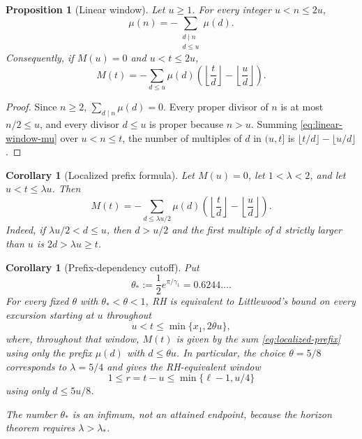 \documentclass[11pt]{amsart}
\numberwithin{equation}{section}
\theoremstyle{plain}
\newtheorem{proposition}[theorem]{Proposition}
\newtheorem{corollary}[theorem]{Corollary}
\theoremstyle{definition}
\theoremstyle{remark}
\begin{document}
\begin{proposition}[Linear window]
\label{prop:linear-window}
Let $u\ge1$. For every integer $u<n\le2u$,
\begin{equation}
\label{eq:linear-window-mu}
\mu(n)=-\sum_{\substack{d\mid n\\ d\le u}}\mu(d).
\end{equation}
Consequently, if $M(u)=0$ and $u<t\le2u$,
\begin{equation}
\label{eq:linear-window-M}
M(t)=-\sum_{d\le u}\mu(d)\left(\left\lfloor\frac td\right\rfloor
-\left\lfloor\frac ud\right\rfloor\right).
\end{equation}
\end{proposition}

\begin{proof}
Since $n\ge2$, $\sum_{d\mid n}\mu(d)=0$. Every proper divisor of $n$ is at
most $n/2\le u$, and every divisor $d\le u$ is proper because $n>u$. Summing
\eqref{eq:linear-window-mu} over $u<n\le t$, the number of multiples of $d$
in $(u,t]$ is $\lfloor t/d\rfloor-\lfloor u/d\rfloor$.
\end{proof}

\begin{corollary}[Localized prefix formula]
\label{cor:localized-prefix}
Let $M(u)=0$, let $1<\lambda<2$, and let $u<t\le\lambda u$.  Then
\begin{equation}
\label{eq:localized-prefix}
M(t)=-\sum_{d\le\lambda u/2}\mu(d)
\left(\left\lfloor\frac td\right\rfloor-
\left\lfloor\frac ud\right\rfloor\right).
\end{equation}
Indeed, if $\lambda u/2<d\le u$, then $d>u/2$ and the first multiple of
$d$ strictly larger than $u$ is $2d>\lambda u\ge t$.
\end{corollary}

\begin{corollary}[Prefix-dependency cutoff]
\label{cor:prefix-cutoff}
Put
\[
\theta_*:=\frac12e^{\pi/\gamma_1}=0.6244\ldots .
\]
For every fixed $\theta$ with $\theta_*<\theta<1$, RH is equivalent to
Littlewood's bound on every excursion starting at $u$ throughout
\[
u<t\le\min\{x_1,2\theta u\},
\]
where, throughout that window, $M(t)$ is given by the sum
\eqref{eq:localized-prefix} using only the prefix
$\mu(d)$ with $d\le\theta u$.  In particular, the choice
$\theta=5/8$ corresponds to $\lambda=5/4$ and gives the RH-equivalent
window
\[
1\le r=t-u\le\min\{\ell-1,u/4\}
\]
using only $d\le5u/8$.

The number $\theta_*$ is an infimum, not an attained endpoint, because the
horizon theorem requires $\lambda>\lambda_*$.
\end{corollary}
\end{document}
